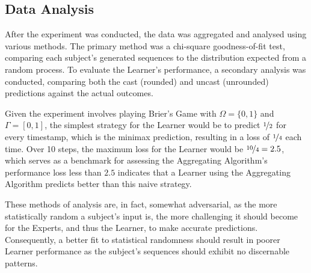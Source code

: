 \subsection{Data Analysis}\label{subsection:data_analysis}
After the experiment was conducted, the data was aggregated and analysed using various methods. The primary method was a chi-square goodness-of-fit test, comparing each subject's generated sequences to the distribution expected from a random process. To evaluate the Learner's performance, a secondary analysis was conducted, comparing both the cast (rounded) and uncast (unrounded) predictions against the actual outcomes.

Given the experiment involves playing Brier's Game with $\Omega = \{0, 1\}$ and $\Gamma = [0, 1]$, the simplest strategy for the Learner would be to predict $\nicefrac{1}{2}$ for every timestamp, which is the minimax prediction, resulting in a loss of $\nicefrac{1}{4}$ each time. Over 10 steps, the maximum loss for the Learner would be $\nicefrac{10}{4} = 2.5$, which serves as a benchmark for assessing the Aggregating Algorithm's performance \textendash{} loss less than $2.5$ indicates that a Learner using the Aggregating Algorithm predicts better than this naive strategy.

These methods of analysis are, in fact, somewhat adversarial, as the more statistically random a subject's input is, the more challenging it should become for the Experts, and thus the Learner, to make accurate predictions. Consequently, a better fit to statistical randomness should result in poorer Learner performance as the subject's sequences should exhibit no discernable patterns.

